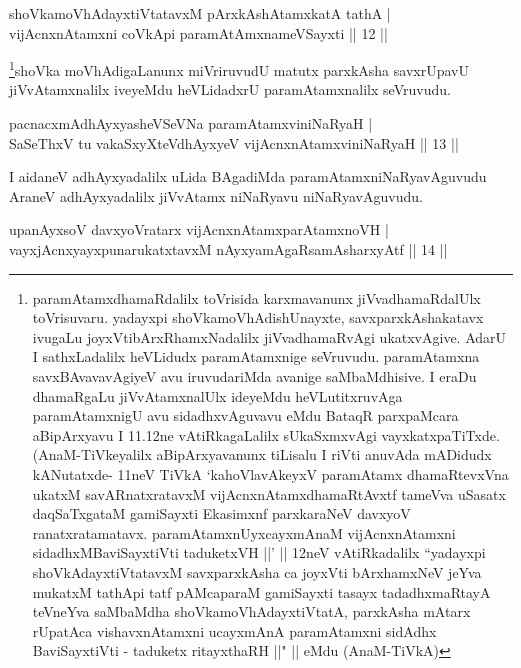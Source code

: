 \begin{shl}
shoVkamoVhAdayxtiVtatavxM pArxkAshAtamxkatA tathA |\\
vijAcnxnAtamxni coVkA\s pi paramAtAmxnameVSayxti \hfill || 12 ||
\end{shl}

\begin{artha}
\footnote{paramAtamxdhamaRdalilx toVrisida karxmavanunx jiVvadhamaRdalUlx toVrisuvaru. yadayxpi shoVkamoVhAdishUnayxte, savxparxkAshakatavx ivugaLu joyxVtibArxRhamxNadalilx jiVvadhamaRvAgi ukatxvAgive. AdarU I sathxLadalilx heVLidudx paramAtamxnige seVruvudu. paramAtamxna savxBAvavavAgiyeV avu iruvudariMda avanige saMbaMdhisive. I eraDu dhamaRgaLu jiVvAtamxnalUlx ideyeMdu heVLutitxruvAga paramAtamxnigU avu sidadhxvAguvavu eMdu BataqR parxpaMcara aBipArxyavu I 11.12ne vAtiRkagaLalilx sUkaSxmxvAgi vayxkatxpaTiTxde. (AnaM-TiVkeyalilx aBipArxyavanunx tiLisalu I riVti anuvAda mADidudx kANutatxde- 11neV TiVkA `kahoVlavAkeyxV paramAtamx dhamaRtevxVna ukatxM savARnatxratavxM vijAcnxnAtamxdhamaRtAvxtf tameVva uSasatx daqSaTxgataM gamiSayxti Ekasimxnf parxkaraNeV davxyoV  ranatxratamatavx. paramAtamxnUyxcayxmAnaM vijAcnxnAtamxni sidadhxMBaviSayxtiVti taduketxVH ||' || 12neV vAtiRkadalilx ``yadayxpi shoVkAdayxtiVtatavxM savxparxkAsha ca joyxVti bArxhamxNeV jeYva mukatxM tathApi tatf pAMcaparaM gamiSayxti tasayx tadadhxmaRtayA teVneYva saMbaMdha shoVkamoVhAdayxtiVtatA, parxkAsha mAtarx rUpatAca vishavxnAtamxni ucayxmAnA paramAtamxni sidAdhx BaviSayxtiVti - taduketx ritayxthaRH ||" || eMdu (AnaM-TiVkA)}shoVka moVhAdigaLanunx miVriruvudU matutx parxkAsha savxrUpavU jiVvAtamxnalilx iveyeMdu heVLidadxrU paramAtamxnalilx seVruvudu.
\end{artha}


\begin{shl}
pacnacxmAdhAyxyasheVSeVNa paramAtamxviniNaRyaH |\\
SaSeThxV tu vakaSxyXteV\s dhAyxyeV vijAcnxnAtamxviniNaRyaH \hfill || 13 ||
\end{shl}

\begin{artha}
I aidaneV adhAyxyadalilx uLida BAgadiMda paramAtamxniNaRyavAguvudu AraneV adhAyxyadalilx jiVvAtamx niNaRyavu niNaRyavAguvudu.
\end{artha}

\begin{shl}
upanAyxsoV davxyoVratarx vijAcnxnAtamxparAtamxnoVH |\\
vayxjAcnxyayxpunarukatxtavxM nAyxyamAgaRsamAsharxyAtf \hfill || 14 ||
\end{shl}

